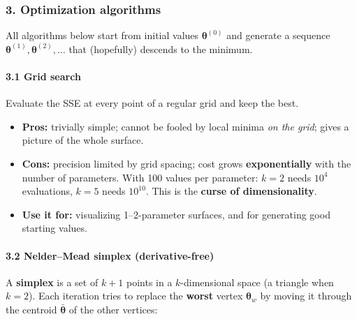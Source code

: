 \subsubsection{3. Optimization algorithms}

All algorithms below start from initial values
\(\boldsymbol\theta^{(0)}\) and generate a sequence
\(\boldsymbol\theta^{(1)}, \boldsymbol\theta^{(2)}, \dots\) that
(hopefully) descends to the minimum.

\paragraph{3.1 Grid search}

Evaluate the SSE at every point of a regular grid and keep the best.

\begin{itemize}
\tightlist
\item
  \textbf{Pros:} trivially simple; cannot be fooled by local minima
  \emph{on the grid}; gives a picture of the whole surface.
\item
  \textbf{Cons:} precision limited by grid spacing; cost grows
  \textbf{exponentially} with the number of parameters. With 100 values
  per parameter: \(k = 2\) needs \(10^4\) evaluations, \(k = 5\) needs
  \(10^{10}\). This is the \textbf{curse of dimensionality}.
\item
  \textbf{Use it for:} visualizing 1--2-parameter surfaces, and for
  generating good starting values.
\end{itemize}

\paragraph{3.2 Nelder--Mead simplex (derivative-free)}

A \textbf{simplex} is a set of \(k+1\) points in a \(k\)-dimensional
space (a triangle when \(k = 2\)). Each iteration tries to replace the
\textbf{worst} vertex \(\boldsymbol\theta_w\) by moving it through the
centroid \(\bar{\boldsymbol\theta}\) of the other vertices:

